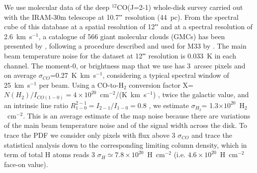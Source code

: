 \documentclass{aa}
\begin{document}
We use molecular data of the deep $^{12}$CO(J=2-1) whole-disk survey
carried out with the IRAM-30m telescope \citep{druard14}  at 10.7$"$
resolution (44~pc). From the spectral cube of this database at a spatial resolution of
12$"$ and at a spectral resolution of 2.6~km~s$^{-1}$,   a catalogue of 566 giant
molecular clouds (GMCs) has been presented by \citet{2017A&A...601A.146C}, 
following a procedure described and used for M33 by \citet{2012A&A...542A.108G}.
The main beam temperature noise  for the dataset at  12$"$  resolution
is  0.033~K in each
channel. The moment-0, or brightness map that we use  has 3~arcsec pixels and on average
$\sigma_{CO}$=0.27~K~km~s$^{-1}$, considering a typical   spectral window of
25~km~s$^{-1}$ per beam. Using a CO-to-H$_2$ conversion factor
X=$N(H_2)/I_{CO(1-0)}=4\times 10^{20}$~cm$^{-2}$/(K~km~s$^{-1}$) \citep{2017A&A...600A..27G}, twice
the galactic value, and an intrinsic line ratio $R^{2-1}_{1-0}=I_{2-1}/I_{1-0}=
0.8$  \citep{druard14}, we estimate $\sigma_{H_2}$= 1.3$\times
10^{20}$~H$_2$~cm$^{-2}$.  This is an average estimate of the map noise because
there are variations of the main beam temperature noise and of the signal width
across the disk.  To trace the PDF we consider only pixels with flux above 3 $\sigma_{CO}$ and
trace the statistical analysis down to the corresponding limiting column density,
which in term of total H atoms reads 3 $\sigma_{H} \simeq 7.8\times
10^{20}$~H~cm$^{-2}$  (i.e. $4.6\times 10^{20}$~H~cm$^{-2}$ face-on value).
\end{document}
